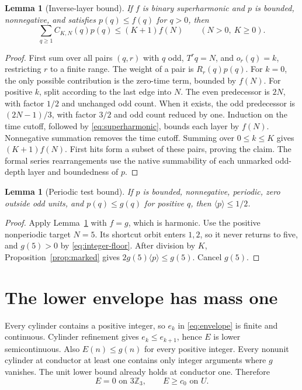 \documentclass[11pt]{article}
\newtheorem{lemma}[theorem]{Lemma}
\theoremstyle{remark}
\newcommand{\Zthree}{\mathbb Z_3}
\newcommand{\avg}[1]{\langle #1\rangle}
\begin{document}
\begin{lemma}[Inverse-layer bound]\label{lem:layer}
If \(f\) is binary superharmonic and \(p\) is bounded,
nonnegative, and satisfies \(p(q)\leq f(q)\) for \(q>0\), then
\begin{equation}\label{eq:layer-cap}
 \sum_{q\geq1}C_{K,N}(q)p(q)\leq(K+1)f(N)
 \qquad(N>0,\ K\geq0).
\end{equation}
\end{lemma}

\begin{proof}
First sum over all pairs \((q,r)\) with \(q\) odd,
\(T^rq=N\), and \(o_r(q)=k\), restricting \(r\) to a finite
range. The weight of a pair is \(R_r(q)p(q)\).
For \(k=0\), the only possible contribution is the zero-time
term, bounded by \(f(N)\). For positive \(k\), split according
to the last edge into \(N\). The even predecessor is \(2N\),
with factor \(1/2\) and unchanged odd count. When it exists, the
odd predecessor is \((2N-1)/3\), with factor \(3/2\) and odd
count reduced by one. Induction on the time cutoff, followed by
\eqref{eq:superharmonic}, bounds each layer by \(f(N)\).
Nonnegative summation removes the time cutoff. Summing over
\(0\leq k\leq K\) gives \((K+1)f(N)\). First hits form a subset
of these pairs, proving the claim. The formal series rearrangements
use the native summability of each unmarked odd-depth layer and
boundedness of \(p\).
\end{proof}

\begin{lemma}[Periodic test bound]\label{lem:periodic-bound}
If \(p\) is bounded, nonnegative, periodic, zero outside odd units,
and \(p(q)\leq g(q)\) for positive \(q\), then \(\avg p\leq1/2\).
\end{lemma}

\begin{proof}
Apply Lemma~\ref{lem:layer} with \(f=g\), which is harmonic.
Use the positive nonperiodic target \(N=5\). Its shortcut orbit
enters \(1,2\), so it never returns to five, and \(g(5)>0\) by
\eqref{eq:integer-floor}. After division by \(K\),
Proposition~\ref{prop:marked} gives
\(2g(5)\avg p\leq g(5)\). Cancel \(g(5)\).
\end{proof}

\section{The lower envelope has mass one}

Every cylinder contains a positive integer, so \(e_k\) in
\eqref{eq:envelope} is finite and continuous. Cylinder refinement
gives \(e_k\leq e_{k+1}\), hence \(E\) is lower semicontinuous.
Also \(E(n)\leq g(n)\) for every positive integer.
Every nonunit cylinder at conductor at least one contains only
integer arguments where \(g\) vanishes. The unit lower bound already
holds at conductor one. Therefore
\begin{equation}\label{eq:envelope-support}
 E=0\text{ on }3\Zthree,\qquad E\geq c_0\text{ on }U.
\end{equation}
\end{document}
